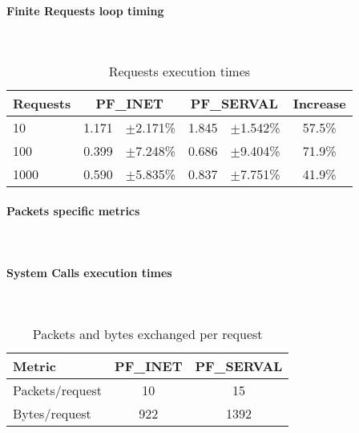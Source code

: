 \paragraph{Finite Requests loop timing} \hfill \\
\begin{table}
\begin{center}
  \begin{tabular}{l||cc|cc|c}
  	\toprule
  	Requests	&	\multicolumn{2}{c}{PF\_INET}	&	\multicolumn{2}{c}{PF\_SERVAL}	&	Increase	\\
  	\midrule
    10			&	1.171		&	$\pm$2.171\%	&	1.845		&	$\pm$1.542\%	&	57.5\%		\\
    100			&	0.399		&	$\pm$7.248\%	&	0.686		&	$\pm$9.404\%	&	71.9\%		\\
    1000		&	0.590		&	$\pm$5.835\%	&	0.837		&	$\pm$7.751\%	&	41.9\%		\\
    \bottomrule
  \end{tabular}
  \caption[Benchmark: Requests execution times]{Requests execution times}
\end{center}
\end{table}


\paragraph{Packets specific metrics} \hfill \\
\paragraph{System Calls execution times} \hfill \\
\begin{table}
\begin{center}
  \begin{tabular}{l||c|c}
  	\toprule
  	Metric				&	PF\_INET	&	PF\_SERVAL	\\
  	\midrule
    Packets/request		&	10			&	15			\\
    Bytes/request		&	922			&	1392		\\
    \bottomrule
  \end{tabular}
  \caption[Benchmark: Packets and bytes exchanged per request]{Packets and bytes exchanged per request}
\end{center}
\end{table}